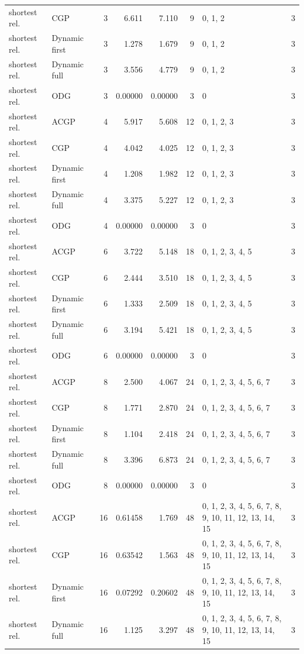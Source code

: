 \documentclass[10pt,a4paper]{article}
\begin{document}
\begin{longtable}{@{}p{23mm}p{29mm}rrrrp{36mm}r@{}}
shortest rel. & CGP & 3 & 6.611 & 7.110 & 9 & 0, 1, 2 & 3 \\
shortest rel. & Dynamic first & 3 & 1.278 & 1.679 & 9 & 0, 1, 2 & 3 \\
shortest rel. & Dynamic full & 3 & 3.556 & 4.779 & 9 & 0, 1, 2 & 3 \\
shortest rel. & ODG & 3 & 0.00000 & 0.00000 & 3 & 0 & 3 \\
shortest rel. & ACGP & 4 & 5.917 & 5.608 & 12 & 0, 1, 2, 3 & 3 \\
shortest rel. & CGP & 4 & 4.042 & 4.025 & 12 & 0, 1, 2, 3 & 3 \\
shortest rel. & Dynamic first & 4 & 1.208 & 1.982 & 12 & 0, 1, 2, 3 & 3 \\
shortest rel. & Dynamic full & 4 & 3.375 & 5.227 & 12 & 0, 1, 2, 3 & 3 \\
shortest rel. & ODG & 4 & 0.00000 & 0.00000 & 3 & 0 & 3 \\
shortest rel. & ACGP & 6 & 3.722 & 5.148 & 18 & 0, 1, 2, 3, 4, 5 & 3 \\
shortest rel. & CGP & 6 & 2.444 & 3.510 & 18 & 0, 1, 2, 3, 4, 5 & 3 \\
shortest rel. & Dynamic first & 6 & 1.333 & 2.509 & 18 & 0, 1, 2, 3, 4, 5 & 3 \\
shortest rel. & Dynamic full & 6 & 3.194 & 5.421 & 18 & 0, 1, 2, 3, 4, 5 & 3 \\
shortest rel. & ODG & 6 & 0.00000 & 0.00000 & 3 & 0 & 3 \\
shortest rel. & ACGP & 8 & 2.500 & 4.067 & 24 & 0, 1, 2, 3, 4, 5, 6, 7 & 3 \\
shortest rel. & CGP & 8 & 1.771 & 2.870 & 24 & 0, 1, 2, 3, 4, 5, 6, 7 & 3 \\
shortest rel. & Dynamic first & 8 & 1.104 & 2.418 & 24 & 0, 1, 2, 3, 4, 5, 6, 7 & 3 \\
shortest rel. & Dynamic full & 8 & 3.396 & 6.873 & 24 & 0, 1, 2, 3, 4, 5, 6, 7 & 3 \\
shortest rel. & ODG & 8 & 0.00000 & 0.00000 & 3 & 0 & 3 \\
shortest rel. & ACGP & 16 & 0.61458 & 1.769 & 48 & 0, 1, 2, 3, 4, 5, 6, 7, 8, 9, 10, 11, 12, 13, 14, 15 & 3 \\
shortest rel. & CGP & 16 & 0.63542 & 1.563 & 48 & 0, 1, 2, 3, 4, 5, 6, 7, 8, 9, 10, 11, 12, 13, 14, 15 & 3 \\
shortest rel. & Dynamic first & 16 & 0.07292 & 0.20602 & 48 & 0, 1, 2, 3, 4, 5, 6, 7, 8, 9, 10, 11, 12, 13, 14, 15 & 3 \\
shortest rel. & Dynamic full & 16 & 1.125 & 3.297 & 48 & 0, 1, 2, 3, 4, 5, 6, 7, 8, 9, 10, 11, 12, 13, 14, 15 & 3 \\

\end{longtable}
\end{document}
